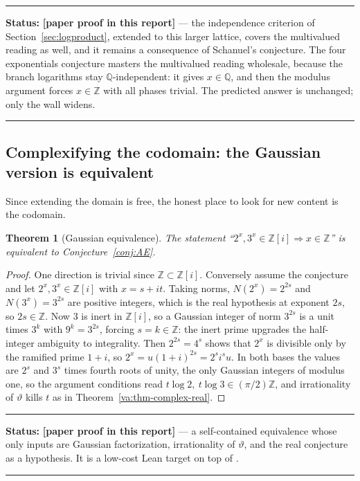 \documentclass[11pt,oneside]{article}
\newtheorem{theorem}{Theorem}[section]
\theoremstyle{definition}
\theoremstyle{remark}
\newcommand{\Z}{\mathbb Z}
\newcommand{\Q}{\mathbb Q}
\newcommand{\thetaq}{\vartheta}
\newcommand{\lean}[1]{\texttt{\detokenize{#1}}}
\newcommand{\statusnew}{\textcolor{newgreen}{\textbf{[paper proof in this report]}}}
\newenvironment{statusbox}[1]
{\begin{center}\begin{minipage}{0.94\textwidth}\raggedright\hbadness=10000\hrule
\vspace{0.45em}\textbf{Status:} #1\par\vspace{0.35em}}
{\vspace{0.35em}\hrule\end{minipage}\end{center}}
\begin{document}
\begin{statusbox}{\statusnew{} --- the independence criterion of
Section~\ref{sec:logproduct}, extended to this larger lattice, covers the multivalued reading
as well, and it remains a consequence of Schanuel's conjecture.  The four exponentials
conjecture masters the multivalued reading wholesale, because the branch logarithms stay
$\Q$-independent: it gives $x\in\Q$, and then the modulus argument forces $x\in\Z$ with all
phases trivial.  The predicted answer is unchanged; only the wall widens.}
\end{statusbox}

\subsection{Complexifying the codomain: the Gaussian version is equivalent}

Since extending the domain is free, the honest place to look for new content is the codomain.

\begin{theorem}[Gaussian equivalence]
\label{va:thm-gaussian}
The statement ``$2^x,3^x\in\Z[i]\Rightarrow x\in\Z$'' is equivalent to
Conjecture~\ref{conj:AE}.
\end{theorem}

\begin{proof}
One direction is trivial since $\Z\subset\Z[i]$.  Conversely assume the conjecture and let
$2^x,3^x\in\Z[i]$ with $x=s+it$.  Taking norms, $N(2^x)=2^{2s}$ and $N(3^x)=3^{2s}$ are
positive integers, which is the real hypothesis at exponent $2s$, so $2s\in\Z$.  Now $3$ is
inert in $\Z[i]$, so a Gaussian integer of norm $3^{2s}$ is a unit times $3^{k}$ with
$9^{k}=3^{2s}$, forcing $s=k\in\Z$: the inert prime upgrades the half-integer ambiguity to
integrality.  Then $2^{2s}=4^{s}$ shows that $2^x$ is divisible only by the ramified prime
$1+i$, so $2^x=u(1+i)^{2s}=2^{s}i^{s}u$.  In both bases the values are $2^{s}$ and $3^{s}$
times fourth roots of unity, the only Gaussian integers of modulus one, so the argument
conditions read $t\log2,\ t\log3\in(\pi/2)\Z$, and irrationality of $\thetaq$ kills $t$ as in
Theorem~\ref{va:thm-complex-real}.
\end{proof}

\begin{statusbox}{\statusnew{} --- a self-contained equivalence whose only inputs are Gaussian
factorization, irrationality of $\thetaq$, and the real conjecture as a hypothesis.  It is a
low-cost Lean target on top of \lean{ComplexSolutions}.}
\end{statusbox}
\end{document}
